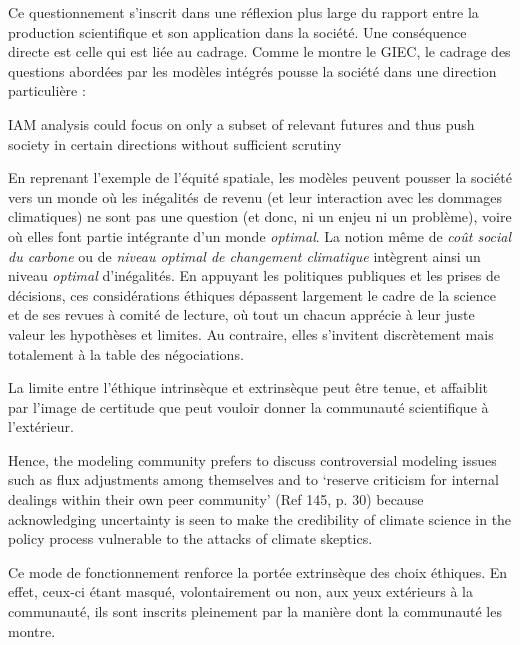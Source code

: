 Ce questionnement s'inscrit dans une réflexion plus large du rapport entre la production scientifique et son application dans la société.  Une conséquence directe est celle qui est liée au cadrage. Comme le montre le GIEC, le cadrage des questions abordées par les modèles intégrés pousse la société dans une direction particulière : 

\begin{authoredquote}
     IAM analysis could focus on only a subset of relevant futures and thus push society in certain directions without sufficient scrutiny 
\end{authoredquote}

En reprenant l'exemple de l'équité spatiale, les modèles peuvent pousser la société vers un monde où les inégalités de revenu (et leur interaction avec les dommages climatiques) ne sont pas une question (et donc, ni un enjeu ni un problème), voire où elles font partie intégrante d'un monde \emph{optimal}. La notion même de \emph{coût social du carbone} ou de \emph{niveau optimal de changement climatique} intègrent ainsi un niveau \emph{optimal} d'inégalités. En appuyant les politiques publiques et les prises de décisions, ces considérations éthiques dépassent largement le cadre de la science et de ses revues à comité de lecture, où tout un chacun apprécie à leur juste valeur les hypothèses et limites. Au contraire, elles s'invitent discrètement mais totalement à la table des négociations. 

La limite entre l'éthique intrinsèque et extrinsèque peut être tenue, et affaiblit par l'image de certitude que peut vouloir donner la communauté scientifique à l'extérieur. 

\begin{authoredquote}
    Hence, the modeling community prefers to discuss controversial modeling issues such as flux adjustments among themselves and to ‘reserve criticism for internal dealings within their own peer community’ (Ref 145, p. 30) because acknowledging uncertainty is seen to make the credibility of climate science in the policy process vulnerable to the attacks of climate skeptics.
\end{authoredquote}

Ce mode de fonctionnement renforce la portée extrinsèque des choix éthiques. En effet, ceux-ci étant masqué, volontairement ou non, aux yeux extérieurs à la communauté, ils sont inscrits pleinement par la manière dont la communauté les montre. 

